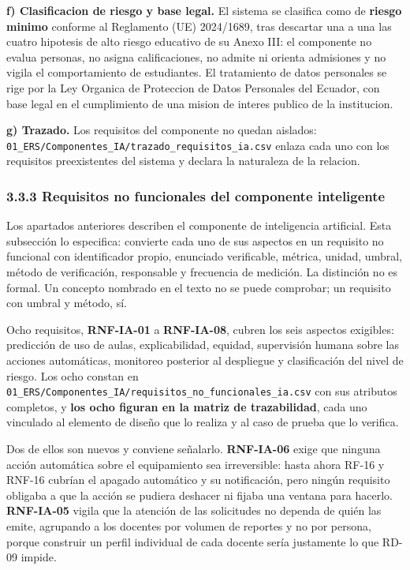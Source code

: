 \medskip
\noindent\textbf{f) Clasificacion de riesgo y base legal.} El sistema se clasifica como
de \textbf{riesgo minimo} conforme al Reglamento (UE) 2024/1689, tras descartar una a una
las cuatro hipotesis de alto riesgo educativo de su Anexo III: el componente no evalua
personas, no asigna calificaciones, no admite ni orienta admisiones y no vigila el
comportamiento de estudiantes. El tratamiento de datos personales se rige por la Ley
Organica de Proteccion de Datos Personales del Ecuador, con base legal en el cumplimiento
de una mision de interes publico de la institucion.

\medskip
\noindent\textbf{g) Trazado.} Los requisitos del componente no quedan aislados:
\nolinkurl{01_ERS/Componentes_IA/trazado_requisitos_ia.csv} enlaza cada uno con los
requisitos preexistentes del sistema y declara la naturaleza de la relacion.

\subsubsection*{3.3.3 Requisitos no funcionales del componente inteligente}


Los apartados anteriores describen el componente de inteligencia artificial. Esta subsección lo especifica: convierte cada uno de sus aspectos en un requisito no funcional con identificador propio, enunciado verificable, métrica, unidad, umbral, método de verificación, responsable y frecuencia de medición. La distinción no es formal. Un concepto nombrado en el texto no se puede comprobar; un requisito con umbral y método, sí.

Ocho requisitos, \textbf{RNF-IA-01} a \textbf{RNF-IA-08}, cubren los seis aspectos exigibles: predicción de uso de aulas, explicabilidad, equidad, supervisión humana sobre las acciones automáticas, monitoreo posterior al despliegue y clasificación del nivel de riesgo. Los ocho constan en \nolinkurl{01_ERS/Componentes_IA/requisitos_no_funcionales_ia.csv} con sus atributos completos, y \textbf{los ocho figuran en la matriz de trazabilidad}, cada uno vinculado al elemento de diseño que lo realiza y al caso de prueba que lo verifica.

Dos de ellos son nuevos y conviene señalarlo. \textbf{RNF-IA-06} exige que ninguna acción automática sobre el equipamiento sea irreversible: hasta ahora RF-16 y RNF-16 cubrían el apagado automático y su notificación, pero ningún requisito obligaba a que la acción se pudiera deshacer ni fijaba una ventana para hacerlo. \textbf{RNF-IA-05} vigila que la atención de las solicitudes no dependa de quién las emite, agrupando a los docentes por volumen de reportes y no por persona, porque construir un perfil individual de cada docente sería justamente lo que RD-09 impide.

